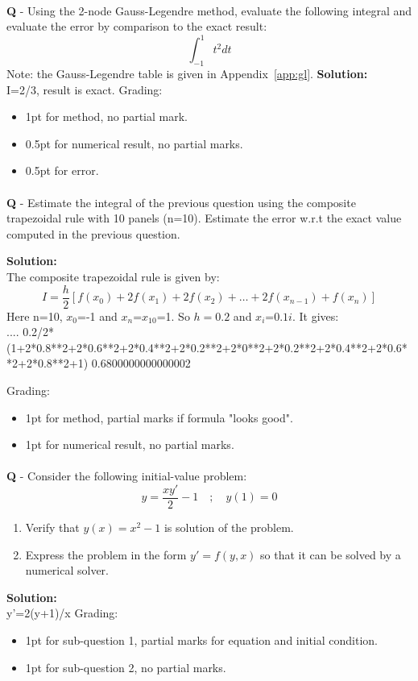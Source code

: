 \documentclass{llncs}
\newcounter{ques}
\renewcommand{\question}[1]{\paragraph{}\textbf{Q\theques} - #1\stepcounter{ques} }
\newcommand{\answer}[1]{\color{red}\textbf{Solution:}\\#1\color{black}}
\begin{document}
\newpage
\question{Using the 2-node Gauss-Legendre method, evaluate the following integral and evaluate the error by comparison to the exact result:
$$
\int_{-1}^1 t^2dt
$$
Note: the Gauss-Legendre table is given in Appendix~\ref{app:gl}.
}
\answer{
I=2/3, result is exact.
Grading:
\begin{itemize}
\item 1pt for method, no partial mark.
\item 0.5pt for numerical result, no partial marks.
\item 0.5pt for error.
\end{itemize}
}

\newpage
\question{Estimate the integral of the previous question using the composite trapezoidal rule with 10 panels (n=10). Estimate the error w.r.t the exact value
computed in the previous question.}

\answer{The composite trapezoidal rule is given by:
$$
I = \frac{h}{2}\left[f(x_0) + 2f(x_1) + 2f(x_2) + \ldots + 2f(x_{n-1}) + f(x_n)\right]
$$
Here n=10, $x_0$=-1 and $x_n$=$x_{10}$=1. So $h=0.2$ and $x_i$=$0.1i$.
It gives:\\
....
0.2/2*(1+2*0.8**2+2*0.6**2+2*0.4**2+2*0.2**2+2*0**2+2*0.2**2+2*0.4**2+2*0.6**2+2*0.8**2+1)
0.6800000000000002

Grading:
\begin{itemize}
\item 1pt for method, partial marks if formula "looks good".
\item 1pt for numerical result, no partial marks.
\end{itemize}
}


\newpage
\question{Consider the following initial-value problem:
$$
y=\frac{xy'}{2}-1 \quad ; \quad y(1)=0
$$
\begin{enumerate}
\item Verify that $y(x) = x^2-1$ is solution of the problem.
\item Express the problem in the form $y'=f(y, x)$ so that it can be solved by a numerical solver.
\end{enumerate}
}

\answer{
y'=2(y+1)/x
Grading:
\begin{itemize}
\item 1pt for sub-question 1, partial marks for equation and initial condition.
\item 1pt for sub-question 2, no partial marks.
\end{itemize}
}
\newpage
\end{document}
